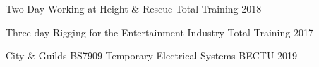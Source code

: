 

\begin{cvhonors}

  \cvhonor
    {Two-Day Working at Height \& Rescue} %
    {Total Training} %
    {} %
    {2018} %

  \cvhonor
    {Three-day Rigging for the Entertainment Industry} %
    {Total Training} %
    {} %
    {2017} %

  \cvhonor
    {City \& Guilds BS7909 Temporary Electrical Systems} %
    {BECTU} %
    {} %
    {2019} %
\end{cvhonors}
